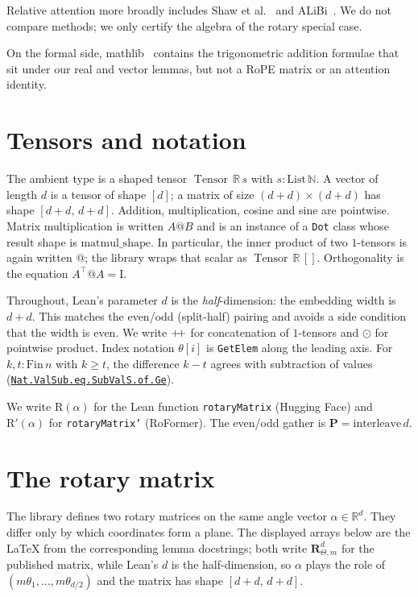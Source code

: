 \documentclass[11pt,a4paper]{article}
\newcommand{\lmod}[1]{\href{http://www.lemma.cn/lean/?module=#1}{\nolinkurl{#1}}}
\newcommand{\R}{\mathbb{R}}
\newcommand{\N}{\mathbb{N}}
\newcommand{\Tensor}{\operatorname{Tensor}}
\newcommand{\rot}{\mathrm{R}}
\newcommand{\eye}{\mathrm{I}}
\newcommand{\concat}{\mathbin{+\mkern-4mu+}}
\begin{document}
Relative attention more broadly includes Shaw et al.~\cite{shaw2018relative} and ALiBi~\cite{press2022alibi}.
We do not compare methods; we only certify the algebra of the rotary special case.

On the formal side, mathlib~\cite{mathlib2020,mathlib} contains the trigonometric addition formulae that sit under our real and vector lemmas, but not a RoPE matrix or an attention identity.

\section{Tensors and notation}
\label{sec:prelim}

The ambient type is a shaped tensor \(\Tensor\,\R\,s\) with \(s:\mathrm{List}\,\N\).
A vector of length \(d\) is a tensor of shape \([d]\); a matrix of size \((d+d)\times(d+d)\) has shape \([d+d,\,d+d]\).
Addition, multiplication, cosine and sine are pointwise.
Matrix multiplication is written \(A @ B\) and is an instance of a \texttt{Dot} class whose result shape is \(\mathrm{matmul\_shape}\).
In particular, the inner product of two \(1\)-tensors is again written \(@\); the library wraps that scalar as \(\Tensor\,\R\,[]\).
Orthogonality is the equation \(A^\top @ A = \eye\).

Throughout, Lean's parameter \(d\) is the \emph{half}-dimension: the embedding width is \(d+d\).
This matches the even/odd (split-half) pairing and avoids a side condition that the width is even.
We write \(\concat\) for concatenation of \(1\)-tensors and \(\odot\) for pointwise product.
Index notation \(\theta[i]\) is \texttt{GetElem} along the leading axis.
For \(k,t:\mathrm{Fin}\,n\) with \(k\ge t\), the difference \(k-t\) agrees with subtraction of values (\lmod{Nat.ValSub.eq.SubValS.of.Ge}).

We write \(\rot(\alpha)\) for the Lean function \texttt{rotaryMatrix} (Hugging Face) and \(\rot'(\alpha)\) for \texttt{rotaryMatrix'} (RoFormer).
The even/odd gather is \(\boldsymbol{P}=\mathrm{interleave}\,d\).

\section{The rotary matrix}
\label{sec:def}

The library defines two rotary matrices on the same angle vector \(\alpha\in\R^d\).
They differ only by which coordinates form a plane.
The displayed arrays below are the LaTeX from the corresponding lemma docstrings; both write \({\boldsymbol{R}}^{d}_{\Theta,m}\) for the published matrix, while Lean's \(d\) is the half-dimension, so \(\alpha\) plays the role of \((m\theta_1,\ldots,m\theta_{d/2})\) and the matrix has shape \([d+d,\,d+d]\).
\end{document}
